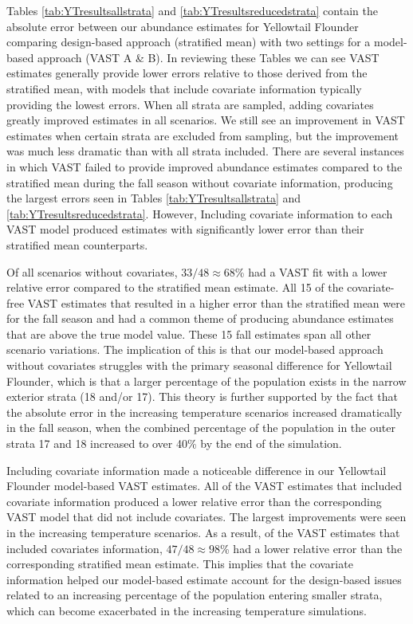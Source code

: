 \documentclass[
  12pt,
]{article}
\begin{document}
Tables \ref{tab:YTresultsallstrata} and \ref{tab:YTresultsreducedstrata} contain the absolute error between our abundance estimates for Yellowtail Flounder comparing design-based approach (stratified mean) with two settings for a model-based approach (VAST A \& B). In reviewing these Tables we can see VAST estimates generally provide lower errors relative to those derived from the stratified mean, with models that include covariate information typically providing the lowest errors. When all strata are sampled, adding covariates greatly improved estimates in all scenarios. We still see an improvement in VAST estimates when certain strata are excluded from sampling, but the improvement was much less dramatic than with all strata included. There are several instances in which VAST failed to provide improved abundance estimates compared to the stratified mean during the fall season without covariate information, producing the largest errors seen in Tables \ref{tab:YTresultsallstrata} and \ref{tab:YTresultsreducedstrata}. However, Including covariate information to each VAST model produced estimates with significantly lower error than their stratified mean counterparts.

Of all scenarios without covariates, \(33/48\approx68\)\% had a VAST fit with a lower relative error compared to the stratified mean estimate. All 15 of the covariate-free VAST estimates that resulted in a higher error than the stratified mean were for the fall season and had a common theme of producing abundance estimates that are above the true model value. These 15 fall estimates span all other scenario variations. The implication of this is that our model-based approach without covariates struggles with the primary seasonal difference for Yellowtail Flounder, which is that a larger percentage of the population exists in the narrow exterior strata (18 and/or 17). This theory is further supported by the fact that the absolute error in the increasing temperature scenarios increased dramatically in the fall season, when the combined percentage of the population in the outer strata 17 and 18 increased to over 40\% by the end of the simulation.

Including covariate information made a noticeable difference in our Yellowtail Flounder model-based VAST estimates. All of the VAST estimates that included covariate information produced a lower relative error than the corresponding VAST model that did not include covariates. The largest improvements were seen in the increasing temperature scenarios. As a result, of the VAST estimates that included covariates information, \(47/48\approx98\)\% had a lower relative error than the corresponding stratified mean estimate. This implies that the covariate information helped our model-based estimate account for the design-based issues related to an increasing percentage of the population entering smaller strata, which can become exacerbated in the increasing temperature simulations.
\end{document}
